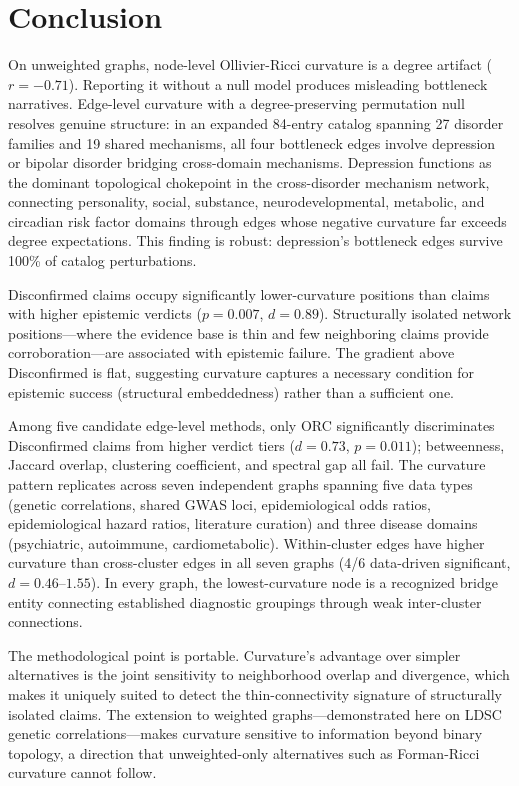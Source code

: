 \documentclass{article}
\begin{document}
\section{Conclusion}

On unweighted graphs, node-level Ollivier-Ricci curvature is a degree artifact ($r = -0.71$). Reporting it without a null model produces misleading bottleneck narratives. Edge-level curvature with a degree-preserving permutation null resolves genuine structure: in an expanded 84-entry catalog spanning 27 disorder families and 19 shared mechanisms, all four bottleneck edges involve depression or bipolar disorder bridging cross-domain mechanisms. Depression functions as the dominant topological chokepoint in the cross-disorder mechanism network, connecting personality, social, substance, neurodevelopmental, metabolic, and circadian risk factor domains through edges whose negative curvature far exceeds degree expectations. This finding is robust: depression's bottleneck edges survive 100\% of catalog perturbations.

Disconfirmed claims occupy significantly lower-curvature positions than claims with higher epistemic verdicts ($p = 0.007$, $d = 0.89$). Structurally isolated network positions---where the evidence base is thin and few neighboring claims provide corroboration---are associated with epistemic failure. The gradient above Disconfirmed is flat, suggesting curvature captures a necessary condition for epistemic success (structural embeddedness) rather than a sufficient one.

Among five candidate edge-level methods, only ORC significantly discriminates Disconfirmed claims from higher verdict tiers ($d = 0.73$, $p = 0.011$); betweenness, Jaccard overlap, clustering coefficient, and spectral gap all fail. The curvature pattern replicates across seven independent graphs spanning five data types (genetic correlations, shared GWAS loci, epidemiological odds ratios, epidemiological hazard ratios, literature curation) and three disease domains (psychiatric, autoimmune, cardiometabolic). Within-cluster edges have higher curvature than cross-cluster edges in all seven graphs (4/6 data-driven significant, $d = 0.46$--$1.55$). In every graph, the lowest-curvature node is a recognized bridge entity connecting established diagnostic groupings through weak inter-cluster connections.

The methodological point is portable. Curvature's advantage over simpler alternatives is the joint sensitivity to neighborhood overlap and divergence, which makes it uniquely suited to detect the thin-connectivity signature of structurally isolated claims. The extension to weighted graphs---demonstrated here on LDSC genetic correlations---makes curvature sensitive to information beyond binary topology, a direction that unweighted-only alternatives such as Forman-Ricci curvature \citep{sreejith2016forman} cannot follow.
\end{document}
